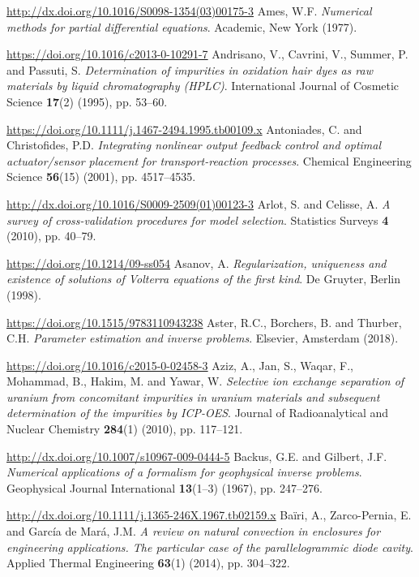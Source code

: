 \begin{thebibliography}{301}
\url{http://dx.doi.org/10.1016/S0098-1354(03)00175-3}
%
%
 Ames, W.F. {\it Numerical methods for partial differential equations}. Academic, New York (1977).

\url{https://doi.org/10.1016/c2013-0-10291-7}
%
%
 Andrisano, V., Cavrini, V., Summer, P. and Passuti, S. {\it Determination of impurities in oxidation hair dyes as raw materials by liquid chromatography (HPLC)}. International Journal of Cosmetic Science {\bf 17}(2) (1995), pp. 53--60.

\url{https://doi.org/10.1111/j.1467-2494.1995.tb00109.x}
%
%
 Antoniades, C. and Christofides, P.D. {\it Integrating nonlinear output feedback control and optimal actuator/sensor placement for transport-reaction processes}. Chemical Engineering Science {\bf 56}(15) (2001), pp. 4517--4535.

\url{http://dx.doi.org/10.1016/S0009-2509(01)00123-3}
%
%
 Arlot, S. and Celisse, A. {\it A survey of cross-validation procedures for model selection}. Statistics Surveys {\bf 4} (2010), pp. 40--79.

\url{https://doi.org/10.1214/09-ss054}
%
%
 Asanov, A. {\it Regularization, uniqueness and existence of solutions of Volterra equations of the first kind}. De Gruyter, Berlin (1998). 

\url{https://doi.org/10.1515/9783110943238}
%
%
 Aster, R.C., Borchers, B. and Thurber, C.H. {\it Parameter estimation and inverse problems}. Elsevier, Amsterdam (2018).

\url{https://doi.org/10.1016/c2015-0-02458-3}
%
%
 Aziz, A., Jan, S., Waqar, F., Mohammad, B., Hakim, M. and Yawar, W. {\it Selective ion exchange separation of uranium from concomitant impurities in uranium materials and subsequent determination of the impurities by ICP-OES}. Journal of Radioanalytical and Nuclear Chemistry {\bf 284}(1) (2010), pp. 117--121.

\url{http://dx.doi.org/10.1007/s10967-009-0444-5}
%
%
 Backus, G.E. and Gilbert, J.F. {\it Numerical applications of a formalism for geophysical inverse problems}. Geophysical Journal International {\bf 13}(1--3) (1967), pp. 247--276. 

\url{http://dx.doi.org/10.1111/j.1365-246X.1967.tb02159.x}
%
%
 Ba\"iri, A., Zarco-Pernia, E. and Garc\'ia de Mar\'a, J.M. {\it A review on natural convection in enclosures for engineering applications. The particular case of the parallelogrammic diode cavity}. Applied Thermal Engineering {\bf 63}(1) (2014), pp. 304--322.


\end{thebibliography}
